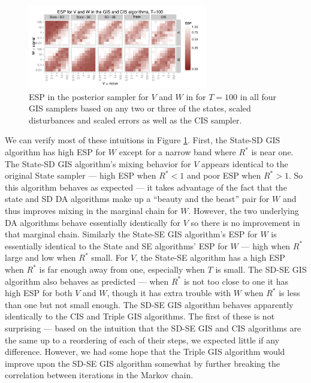 \documentclass{article}
\begin{document}
\begin{figure}[!ht]
\centering
\includegraphics[width=0.7\textwidth]{intESplot100}
\caption{ESP in the posterior sampler for $V$ and $W$ in for $T=100$ in all four GIS samplers based on any two or three of the states, scaled disturbances and scaled errors as well as the CIS sampler.}
\label{intESplot}
\end{figure}

We can verify most of these intuitions in Figure \ref{intESplot}. First, the State-SD GIS algorithm has high ESP for $W$ except for a narrow band where $R^*$ is near one. The State-SD GIS algorithm's mixing behavior for $V$ appears identical to the original State sampler --- high ESP when $R^* < 1$ and poor ESP when $R^* > 1$. So this algorithm behaves as expected --- it takes advantage of the fact that the state and SD DA algorithms make up a ``beauty and the beast'' pair for $W$ and thus improves mixing in the marginal chain for $W$. However, the two underlying DA algorithms behave essentially identically for $V$ so there is no improvement in that marginal chain. Similarly the State-SE GIS algorithm's ESP for $W$ is essentially identical to the State and SE algorithms' ESP for $W$ --- high when $R^*$ large and low when $R^*$ small. For $V$, the State-SE algorithm has a high ESP when $R^*$ is far enough away from one, especially when $T$ is small. The SD-SE GIS algorithm also behaves as predicted --- when $R^*$ is not too close to one it has high ESP for both $V$ and $W$, though it has extra trouble with $W$ when $R^*$ is less than one but not small enough. The SD-SE GIS algorithm behaves apparently identically to the CIS and Triple GIS algorithms. The first of these is not surprising --- based on the intuition that the SD-SE GIS and CIS algorithms are the same up to a reordering of each of their steps, we expected little if any difference. However, we had some hope that the Triple GIS algorithm would improve upon the SD-SE GIS algorithm somewhat by further breaking the correlation between iterations in the Markov chain. 
\end{document}
